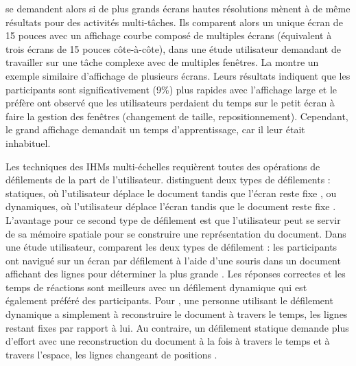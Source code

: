 

\cite{Czerwinski2003} se demandent alors si de plus grands écrans hautes résolutions mènent à de même résultats pour des activités multi-tâches. Ils comparent alors un unique écran de 15 pouces avec un affichage courbe composé de multiples écrans (équivalent à trois écrans de 15 pouces côte-à-côte), dans une étude utilisateur demandant de travailler sur une tâche complexe avec de multiples fenêtres. La  montre un exemple similaire d'affichage de plusieurs écrans. Leurs résultats indiquent que les participants sont significativement (9\%) plus rapides avec l'affichage large et le préfère \citeauthor{Czerwinski2003} ont observé que les utilisateurs perdaient du temps sur le petit écran à faire la gestion des fenêtres (changement de taille, repositionnement). Cependant, le grand affichage demandait un temps d'apprentissage, car il leur était inhabituel.


Les techniques des IHMs multi-échelles requièrent toutes des opérations de défilements de la part de l'utilisateur. \cite{Mehra2006} distinguent deux types de défilements : statiques, où l'utilisateur déplace le document tandis que l'écran reste fixe , ou dynamiques, où l'utilisateur déplace l'écran tandis que le document reste fixe . L'avantage pour ce second type de défilement est que l'utilisateur peut se servir de sa mémoire spatiale pour se construire une représentation du document. Dans une étude utilisateur, \citeauthor{Mehra2006} comparent les deux types de défilement : les participants ont navigué sur un écran par défilement à l'aide d'une souris dans un document affichant des lignes pour déterminer la plus grande . Les réponses correctes et les temps de réactions sont meilleurs avec un défilement dynamique qui est également préféré des participants. Pour \citeauthor{Mehra2006}, une personne utilisant le défilement dynamique a simplement à reconstruire le document à travers le temps, les lignes restant fixes par rapport à lui. Au contraire, un défilement statique demande plus d'effort avec une reconstruction du document à la fois à travers le temps et à travers l'espace, les lignes changeant de positions .

